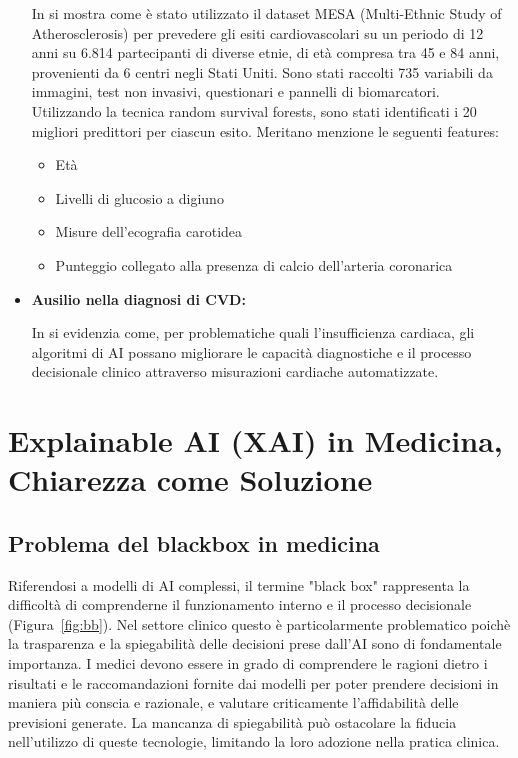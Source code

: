 \begin{itemize}
    
    In %
    \cite{AIcardio3} si mostra come è stato utilizzato il dataset MESA (Multi-Ethnic Study of Atherosclerosis) per prevedere gli esiti cardiovascolari su un periodo di 12 anni su 6.814 partecipanti di diverse etnie, di età compresa tra 45 e 84 anni, provenienti da 6 centri negli Stati Uniti. Sono stati raccolti 735 variabili da immagini, test non invasivi, questionari e pannelli di biomarcatori. Utilizzando la tecnica random survival forests, sono stati identificati i 20 migliori predittori per ciascun esito.
    Meritano menzione le seguenti features:
    \begin{itemize}
        \item Età
        \item Livelli di glucosio a digiuno 
        \item Misure dell'ecografia carotidea
        \item Punteggio collegato alla presenza di calcio dell'arteria coronarica
    \end{itemize}

    \item \textbf{Ausilio nella diagnosi di CVD:}

    In %
    \cite{AIcardio4} si evidenzia come, per problematiche quali l'insufficienza cardiaca, gli algoritmi di AI possano migliorare le capacità diagnostiche e il processo decisionale clinico attraverso misurazioni cardiache automatizzate. 
\end{itemize}
\section{Explainable AI (XAI) in Medicina, Chiarezza come Soluzione }

\subsection{Problema del blackbox in medicina}

Riferendosi a modelli di AI complessi, il termine "black box" rappresenta la difficoltà di comprenderne il funzionamento interno e il processo decisionale (Figura~\ref{fig:bb}). Nel settore clinico questo è particolarmente problematico poichè la trasparenza e la spiegabilità delle decisioni prese dall'AI sono di fondamentale importanza. 
I medici devono essere in grado di comprendere le ragioni dietro i risultati e le raccomandazioni fornite dai modelli per poter prendere decisioni in maniera più conscia e razionale, e valutare criticamente l'affidabilità delle previsioni generate. La mancanza di spiegabilità può ostacolare la fiducia nell'utilizzo di queste tecnologie, limitando la loro adozione nella pratica clinica\cite{trustXAI}. 


